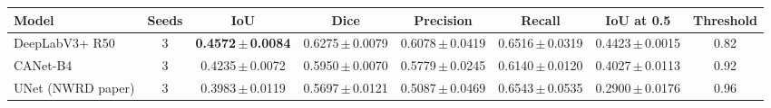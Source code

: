 \begin{tabular}{lccccccc}
\toprule
Model & Seeds & IoU & Dice & Precision & Recall & IoU at 0.5 & Threshold \\
\midrule
DeepLabV3+ R50 & 3 & \textbf{0.4572\,$\pm$\,0.0084} & 0.6275\,$\pm$\,0.0079 & 0.6078\,$\pm$\,0.0419 & 0.6516\,$\pm$\,0.0319 & 0.4423\,$\pm$\,0.0015 & 0.82 \\
CANet-B4 & 3 & 0.4235\,$\pm$\,0.0072 & 0.5950\,$\pm$\,0.0070 & 0.5779\,$\pm$\,0.0245 & 0.6140\,$\pm$\,0.0120 & 0.4027\,$\pm$\,0.0113 & 0.92 \\
UNet (NWRD paper) & 3 & 0.3983\,$\pm$\,0.0119 & 0.5697\,$\pm$\,0.0121 & 0.5087\,$\pm$\,0.0469 & 0.6543\,$\pm$\,0.0535 & 0.2900\,$\pm$\,0.0176 & 0.96 \\
\bottomrule
\end{tabular}
